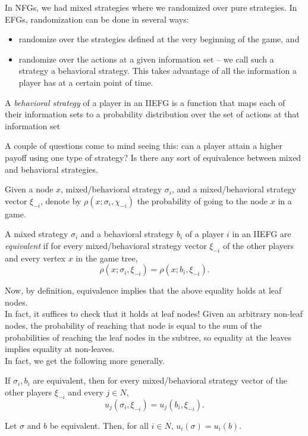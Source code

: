 	In NFGs, we had mixed strategies where we randomized over pure strategies. In EFGs, randomization can be done in several ways:
	\begin{itemize}
		\item randomize over the strategies defined at the very beginning of the game, and
		\item randomize over the actions at a given information set -- we call such a strategy a behavioral strategy. This takes advantage of all the information a player has at a certain point of time.
	\end{itemize}

	\begin{fdef}
		A \emph{behavioral strategy} of a player in an IIEFG is a function that maps each of their information sets to a probability distribution over the set of actions at that information set
	\end{fdef}

	A couple of questions come to mind seeing this: can a player attain a higher payoff using one type of strategy? Is there any sort of equivalence between mixed and behavioral strategies.

	Given a node $x$, mixed/behavioral strategy $\sigma_i$, and a mixed/behavioral strategy vector $\xi_{-i}$, denote by $\rho(x;\sigma_i,\chi_{-i})$ the probability of going to the node $x$ in a game.
	\begin{fdef}
		A mixed strategy $\sigma_i$ and a behavioral strategy $b_i$ of a player $i$ in an IIEFG are \emph{equivalent} if for every mixed/behavioral strategy vector $\xi_{-i}$ of the other players and every vertex $x$ in the game tree,
		\[ \rho(x;\sigma_i,\xi_{-i}) = \rho(x;b_i,\xi_{-i}). \]
	\end{fdef}


	Now, by definition, equivalence implies that the above equality holds at leaf nodes.\\
	In fact, it suffices to check that it holds at leaf nodes! Given an arbitrary non-leaf nodes, the probability of reaching that node is equal to the sum of the probabilities of reaching the leaf nodes in the subtree, so equality at the leaves implies equality at non-leaves.\\
	In fact, we get the following more generally.

	\begin{ftheo}
		If $\sigma_i,b_i$ are equivalent, then for every mixed/behavioral strategy vector of the other players $\xi_{-i}$ and every $j \in N$,
		\[ u_j(\sigma_i,\xi_{-i}) = u_j(b_i,\xi_{-i}). \]
	\end{ftheo}
	\begin{fcor}
		Let $\sigma$ and $b$ be equivalent. Then, for all $i \in N$, $u_i(\sigma) = u_i(b)$.
	\end{fcor}

